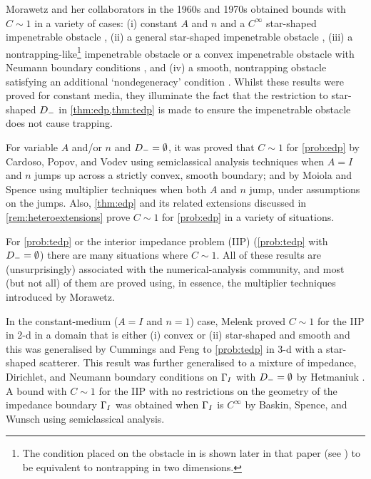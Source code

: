 Morawetz and her collaborators in the 1960s and 1970s obtained bounds with $C \sim 1$ in a variety of cases: (i) constant $A$ and $n$ and a $C^\infty$ star-shaped impenetrable obstacle \cite{Mo:61}, (ii) a general star-shaped impenetrable obstacle \cite{MoLu:68}, (iii) a nontrapping-like\footnote{The condition placed on the obstacle in \cite[Equation (1.3)]{Mo:75} is shown later in that paper (see \cite[Equation (1.3a)]{Mo:75}) to be equivalent to nontrapping in two dimensions.} impenetrable obstacle or a convex impenetrable obstacle with Neumann boundary conditions \cite{Mo:75}, and (iv) a smooth, nontrapping obstacle satisfying an additional `nondegeneracy' condition \cite{MoRaSt:77}. Whilst these results were proved for constant media, they illuminate the fact that the restriction to star-shaped $D_{-}$ in \cref{thm:edp,thm:tedp} is made to ensure the impenetrable obstacle does not cause trapping.

For variable $A$ and/or $n$ and $D_{-} = \emptyset$, it was proved that $C \sim 1$ for \cref{prob:edp} by Cardoso, Popov, and Vodev \cite{CaPoVo:99,PoVo:99b} using semiclassical analysis techniques when $A=I$ and $n$ jumps up across a strictly convex, smooth boundary; and by Moiola and Spence \cite{MoSp:19} using multiplier techniques when both $A$ and $n$ jump, under assumptions on the jumps. Also, \cref{thm:edp} and its related extensions discussed in \cref{rem:heteroextensions} prove $C \sim 1$ for \cref{prob:edp} in a variety of situations.

For \cref{prob:tedp} or the interior impedance problem (IIP) (\cref{prob:tedp} with $D_{-}=\emptyset$) there are many situations where $C \sim 1.$  All of these results are (unsurprisingly) associated with the numerical-analysis community, and most (but not all) of them are proved using, in essence, the multiplier techniques introduced by Morawetz.

In the constant-medium ($A=I$ and $n=1$) case, Melenk \cite{Me:95} proved $C\sim 1$ for the IIP in 2-d in a domain that is either (i) convex or (ii) star-shaped and smooth and this was generalised by Cummings and Feng \cite{CuFe:06} to \cref{prob:tedp} in 3-d with a star-shaped scatterer. This result was further generalised to a mixture of impedance, Dirichlet, and Neumann boundary conditions on $\Gamma_{I}$ with $D_{-}=\emptyset$ by Hetmaniuk \cite{He:07}. A bound with $C \sim 1$ for the IIP with no restrictions on the geometry of the impedance boundary $\Gamma_{I}$ was obtained when $\Gamma_{I}$ is $C^\infty$ by Baskin, Spence, and Wunsch \cite{BaSpWu:16} using semiclassical analysis.

